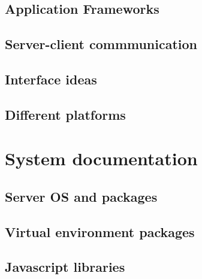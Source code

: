 \documentclass{report}
\begin{document}
\section{Application Frameworks}
\section{Server-client commmunication}
\section{Interface ideas}
\section{Different platforms}

\chapter{System documentation}
\section{Server OS and packages}
\section{Virtual environment packages}
\section{Javascript libraries}
\end{document}
